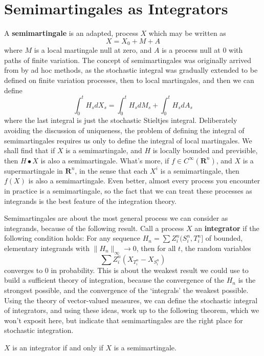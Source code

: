 \section{Semimartingales as Integrators}

A {\bf semimartingale} is an adapted, process $X$ which may be written as
%
\[ X = X_0 + M + A \]
%
where $M$ is a local martingale null at zero, and $A$ is a process null at 0 with paths of finite variation. The concept of semimartingales was originally arrived from by ad hoc methods, as the stochastic integral was gradually extended to be defined on finite variation processes, then to local martingales, and then we can define
%
\[ \int_0^t H_s dX_s = \int_0^t H_s dM_s + \int_0^t H_s dA_s \]
%
where the last integral is just the stochastic Stieltjes integral. Deliberately avoiding the discussion of uniqueness, the problem of defining the integral of semimartingales requires us only to define the integral of local martingales. We shall find that if $X$ is a semimartingale, and $H$ is locally bounded and previsible, then $H \bullet X$ is also a semimartingale. What's more, if $f \in C^\infty(\mathbf{R}^n)$, and $X$ is a supermartingale in $\mathbf{R}^n$, in the sense that each $X^i$ is a semimartingale, then $f(X)$ is also a semimartingale. Even better, almost every process you encounter in practice is a semimartingale, so the fact that we can treat these processes as integrands is the best feature of the integration theory.

Semimartingales are about the most general process we can consider as integrands, because of the following result. Call a process $X$ an {\bf integrator} if the following condition holds: For any sequence $H_n = \sum Z^n_i (S^n_i, T^n_i]$ of bounded, elementary integrands with $\| H_n \|_\infty \to 0$, then for all $t$, the random variables
%
\[ \sum Z^n_i \left( X_{T^n_i} - X_{S^n_i} \right) \]
%
converges to 0 in probability. This is about the weakest result we could use to build a sufficient theory of integration, because the convergence of the $H_n$ is the strongest possible, and the convergence of the `integrals' the weakest possible. Using the theory of vector-valued measures, we can define the stochastic integral of integrators, and using these ideas, work up to the following theorem, which we won't exposit here, but indicate that semimartingales are the right place for stochastic integration.

\begin{theorem}
    $X$ is an integrator if and only if $X$ is a semimartingale.
\end{theorem}

